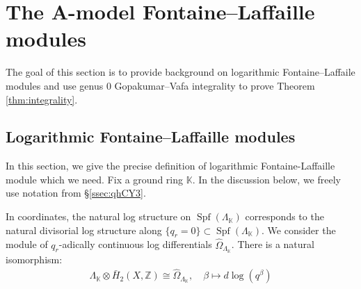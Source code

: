 \documentclass[reqno]{amsart}
\numberwithin{equation}{section}
\numberwithin{equation}{section}
\numberwithin{equation}{section}
\theoremstyle{definition}
\theoremstyle{remark}
\theoremstyle{remark}
\begin{document}
\section{The A-model Fontaine--Laffaille modules}
The goal of this section is to provide background on logarithmic Fontaine--Laffaile modules and use genus $0$ Gopakumar--Vafa integrality to prove Theorem \ref{thm:integrality}.


\subsection{Logarithmic Fontaine--Laffaille modules}\label{subsection:FL definitions}
 In this section, we give the precise definition of logarithmic Fontaine-Laffaille module which we need. Fix a ground ring $\mathbb{K}$. In the discussion below, we freely use notation from \S \ref{ssec:qhCY3}.
 

 In coordinates, the natural log structure on $\operatorname{Spf}(\Lambda_{\mathbb{K}})$ corresponds to the natural divisorial log structure along $\lbrace q_r=0 \rbrace \subset \operatorname{Spf}(\Lambda_{\mathbb{K}})$. We consider the module of $q_r$-adically continuous log differentials $\hat{\Omega}_{\Lambda_\mathbb{K}}$. There is a natural isomorphism: 
\begin{align} \label{eq:logarithmicforms} \Lambda_\mathbb{K} \otimes \bar{H}_2(X,\mathbb{Z}) \cong \hat{\Omega}_{\Lambda_\mathbb{K}} , \quad \beta \mapsto d\operatorname{log}(q^{\beta})  \end{align}
\end{document}
